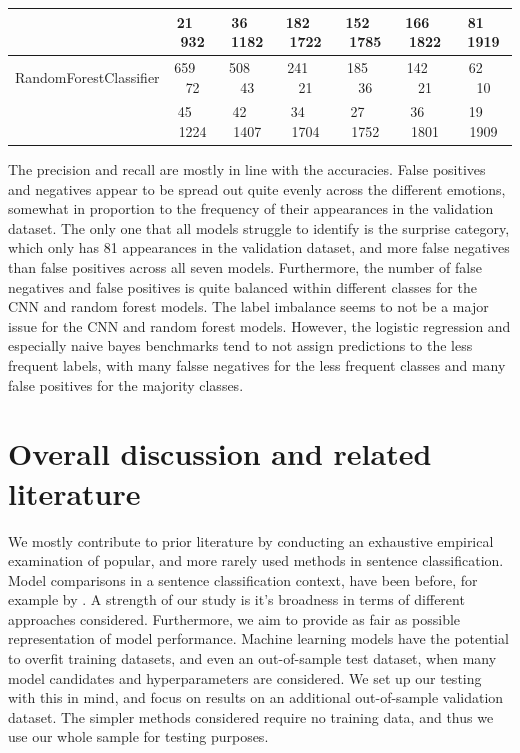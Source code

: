 \documentclass[conference]{IEEEtran}
\begin{document}
\begin{table}[htbp]
\begin{center}
\begin{tabular}{|c|c|c|c|c|c|c|}
 & 21$\;$$\;$$\;$$\;$932 & 36$\;$$\;$$\;$$\;$1182 & 182$\;$$\;$$\;$$\;$1722 & 152$\;$$\;$$\;$$\;$1785 & 166$\;$$\;$$\;$$\;$1822 & 81$\;$$\;$$\;$$\;$1919 \\ 
\hline
RandomForestClassifier & 659$\;$$\;$$\;$$\;$72 & 508$\;$$\;$$\;$$\;$43 & 241$\;$$\;$$\;$$\;$21 & 185$\;$$\;$$\;$$\;$36 & 142$\;$$\;$$\;$$\;$21 & 62$\;$$\;$$\;$$\;$10 \\ 

 & 45$\;$$\;$$\;$$\;$1224 & 42$\;$$\;$$\;$$\;$1407 & 34$\;$$\;$$\;$$\;$1704 & 27$\;$$\;$$\;$$\;$1752 & 36$\;$$\;$$\;$$\;$1801 & 19$\;$$\;$$\;$$\;$1909 \\ 
\hline
\end{tabular}
\label{taba2}
\end{center}
\end{table}

The precision and recall are mostly in line with the accuracies. False positives and negatives appear to be spread out quite evenly across the different emotions, somewhat in proportion to the frequency of their appearances in the validation dataset. The only one that all models struggle to identify is the surprise category, which only has 81 appearances in the validation dataset, and more false negatives than false positives across all seven models. Furthermore, the number of false negatives and false positives is quite balanced within different classes for the CNN and random forest models. The label imbalance seems to not be a major issue for the CNN and random forest models. However, the logistic regression and especially naive bayes benchmarks tend to not assign predictions to the less frequent labels, with many falsse negatives for the less frequent classes and many false positives for the majority classes.

\section{Overall discussion and related literature}

We mostly contribute to prior literature by conducting an exhaustive empirical examination of popular, and more rarely used methods in sentence classification. Model comparisons in a sentence classification context, have been before, for example by \cite{colas}. A strength of our study is it's broadness in terms of different approaches considered. Furthermore, we aim to provide as fair as possible representation of model performance. Machine learning models have the potential to overfit training datasets, and even an out-of-sample test dataset, when many model candidates and hyperparameters are considered. We set up our testing with this in mind, and focus on results on an additional out-of-sample validation dataset. The simpler methods considered require no training data, and thus we use our whole sample for testing purposes.
\end{document}
